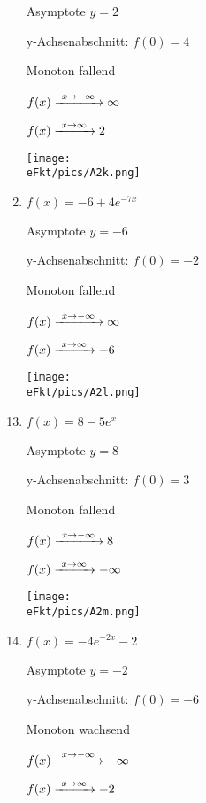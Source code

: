 \begin{Answer}[ref=eFktA2]
\begin{minipage}{\textwidth}
\begin{minipage}{0.5\textwidth}
\begin{enumerate}[label=\alph*)]
				Asymptote \(y=2\)

				y-Achsenabschnitt: \(f(0)=4\)

				Monoton fallend

				\(f(x)\xrightarrow{\hphantom{\ }x\to-\infty\hphantom{\ }}\infty\)

				\(f(x)\xrightarrow{\hphantom{\ }x\to\infty\hphantom{\ }}2\)

				\texttt{[image: \\eFkt/pics/A2k.png]}
				\item \(f(x)=-6+4e^{-7x}\)

				Asymptote \(y=-6\)

				y-Achsenabschnitt: \(f(0)=-2\)

				Monoton fallend

				\(f(x)\xrightarrow{\hphantom{\ }x\to-\infty\hphantom{\ }}\infty\)

				\(f(x)\xrightarrow{\hphantom{\ }x\to\infty\hphantom{\ }}-6\)

				\texttt{[image: \\eFkt/pics/A2l.png]}
			\end{enumerate}
		\end{minipage}%
	\end{minipage}
	\newpage
	\begin{minipage}{\textwidth}
		\begin{minipage}{0.5\textwidth}
			\begin{enumerate}[label=\alph*)]
				\setcounter{enumi}{12}
				\item \(f(x)=8-5e^{x}\)

				Asymptote \(y=8\)

				y-Achsenabschnitt: \(f(0)=3\)

				Monoton fallend

				\(f(x)\xrightarrow{\hphantom{\ }x\to-\infty\hphantom{\ }}8\)

				\(f(x)\xrightarrow{\hphantom{\ }x\to\infty\hphantom{\ }}-\infty\)

				\texttt{[image: \\eFkt/pics/A2m.png]}
				\item \(f(x)=-4e^{-2x}-2\)

				Asymptote \(y=-2\)

				y-Achsenabschnitt: \(f(0)=-6\)

				Monoton wachsend

				\(f(x)\xrightarrow{\hphantom{\ }x\to-\infty\hphantom{\ }}-\infty\)

				\(f(x)\xrightarrow{\hphantom{\ }x\to\infty\hphantom{\ }}-2\)


\end{enumerate}
\end{minipage}
\end{minipage}
\end{Answer}
